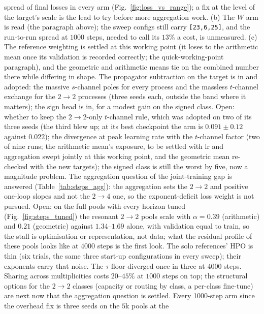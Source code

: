 \documentclass[11pt]{article}
\newcommand{\code}[1]{\texttt{#1}}
\begin{document}
\begin{itemize}
    spread of final losses in every arm (Fig.~\ref{fig:loss_vs_range}); a fix at the level
    of the target's scale is the lead to try before more aggregation work. (b) The $W$ arm is
    read (the paragraph above); the sweep configs still carry \code{[23,6,25]}, and the
    run-to-run spread at $1000$ steps, needed to call its $13\%$ a cost, is unmeasured. (c) The reference weighting is
    settled at this working point (it loses to the arithmetic mean once its validation is
    recorded correctly; the quick-working-point paragraph), and the geometric and arithmetic
    means tie on the combined number there while differing in shape. The propagator subtraction on the
    target is in and adopted: the massive $s$-channel poles for every process and the
    massless $t$-channel exchange for the $2\to2$ processes (three seeds each, outside the
    band where it matters); the sign head is in, for a modest gain on the signed class.
    Open: whether to keep the $2\to2$-only $t$-channel rule, which was adopted on two of its three
    seeds (the third blew up; at its best checkpoint the arm is $0.091\pm0.12$ against $0.022$);
    the divergence at peak learning rate with the $t$-channel factor (two of nine
    runs; the arithmetic mean's exposure, to be settled with lr and aggregation swept
    jointly at this working point, and the geometric mean re-checked with the new targets);
    the signed class is still the worst by five, now a magnitude problem. The aggregation
    question of the joint-training gap is answered (Table~\ref{tab:steps_agg}): the aggregation
    sets the $2\to2$ and positive one-loop slopes and not the $2\to4$ one, so the
    exponent-deficit loss weight is not pursued. Open: on the full pools with every horizon
    tuned (Fig.~\ref{fig:steps_tuned}) the resonant $2\to2$ pools scale with $\alpha=0.39$
    (arithmetic) and $0.21$ (geometric) against $1.34$--$1.69$ alone, with validation equal to
    train, so the stall is optimisation or representation, not data; what the residual profile
    of these pools looks like at $4000$ steps is the first look. The solo references' HPO is
    thin (six trials, the same three start-up configurations in every sweep); their exponents
    carry that noise. The $\tau$ floor diverged once in three at $4000$ steps. Sharing across multiplicities costs $20$--$45\%$ at
    $1000$ steps on top; the structural options for the $2\to2$ classes (capacity or routing by
    class, a per-class fine-tune) are next now that the aggregation question is settled.
    Every 1000-step arm since the overhead fix is three seeds on the $5$k pools at the

\end{itemize}
\end{document}
